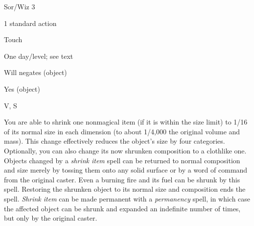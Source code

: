 
\begin{description*}
\item[Level:] Sor/Wiz 3
\item[Casting Time:] 1 standard action
\item[Range:] Touch
\item[Duration:] One day/level; see text
\item[Saving Throw:] Will negates (object)
\item[Spell Resistance:] Yes (object)
\item[Components:] V, S
\end{description*}

You are able to shrink one nonmagical item (if it is within the size limit) to
1/16 of its normal size in each dimension (to about 1/4,000 the original volume
and mass). This change effectively reduces the object's size by four categories.
Optionally, you can also change its now shrunken composition to a clothlike one.
Objects changed by a \textit{shrink item} spell can be returned to normal composition
and size merely by tossing them onto any solid surface or by a word of command
from the original caster. Even a burning fire and its fuel can be shrunk by this
spell. Restoring the shrunken object to its normal size and composition ends the
spell.
\textit{Shrink item} can be made permanent with a \textit{permanency} spell, in
which case the affected object can be shrunk and expanded an indefinite number
of times, but only by the original caster.